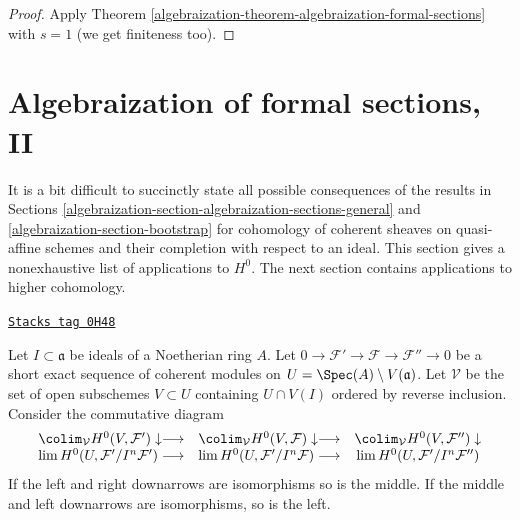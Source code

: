 \begin{proof}

Apply Theorem \ref{algebraization-theorem-algebraization-formal-sections} with $s = 1$
(we get finiteness too).
\end{proof}

\section{Algebraization of formal sections, II}
\label{algebraization-section-algebraization-sections-coherent}
It is a bit difficult to succinctly state all possible
consequences of the results in
Sections \ref{algebraization-section-algebraization-sections-general} and
\ref{algebraization-section-bootstrap}
for cohomology of coherent sheaves on quasi-affine schemes
and their completion with respect to an ideal.
This section gives a nonexhaustive list of
applications to $H^0$. The next section contains
applications to higher cohomology.

\begin{lemma}[Ses H0]
\label{algebraization-lemma-ses-H0}
\href{https://stacks.math.columbia.edu/tag/0H48}{\texttt{Stacks tag 0H48}}

Let $I \subset \mathfrak a$ be ideals of a Noetherian ring $A$.
Let $0 \to \mathcal{F}' \to \mathcal{F} \to \mathcal{F}'' \to 0$
be a short exact sequence of coherent modules on
$U = \Spec(A) \setminus V(\mathfrak a)$. Let $\mathcal{V}$
be the set of open subschemes $V \subset U$ containing
$U \cap V(I)$ ordered by reverse inclusion.
Consider the commutative diagram
$$
\begin{array}{ccc}\colim_\mathcal{V} H^0(V, \mathcal{F}') \downarrow\longrightarrow & \colim_\mathcal{V} H^0(V, \mathcal{F}) \downarrow\longrightarrow & \colim_\mathcal{V} H^0(V, \mathcal{F}'') \downarrow \\ \lim H^0(U, \mathcal{F}'/I^n\mathcal{F}') \longrightarrow & \lim H^0(U, \mathcal{F}'/I^n\mathcal{F}) \longrightarrow & \lim H^0(U, \mathcal{F}'/I^n\mathcal{F}'')\end{array}
$$
If the left and right downarrows are isomorphisms so is the middle.
If the middle and left downarrows are isomorphisms, so is the left.
\end{lemma}

